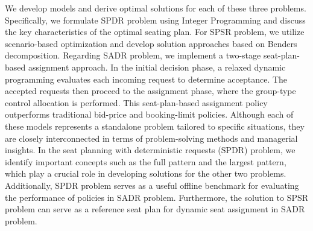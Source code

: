 

We develop models and derive optimal solutions for each of these three problems. Specifically, we formulate SPDR problem using Integer Programming and discuss the key characteristics of the optimal seating plan. For SPSR problem, we utilize scenario-based optimization and develop solution approaches based on Benders decomposition. Regarding SADR problem, we implement a two-stage seat-plan-based assignment approach. In the initial decision phase, a relaxed dynamic programming evaluates each incoming request to determine acceptance. The accepted requests then proceed to the assignment phase, where the group-type control allocation is performed. This seat-plan-based assignment policy outperforms traditional bid-price and booking-limit policies. Although each of these models represents a standalone problem tailored to specific situations, they are closely interconnected in terms of problem-solving methods and managerial insights. In the seat planning with deterministic requests (SPDR) problem, we identify important concepts such as the full pattern and the largest pattern, which play a crucial role in developing solutions for the other two problems. Additionally, SPDR problem serves as a useful offline benchmark for evaluating the performance of policies in SADR problem. Furthermore, the solution to SPSR problem can serve as a reference seat plan for dynamic seat assignment in SADR problem.




